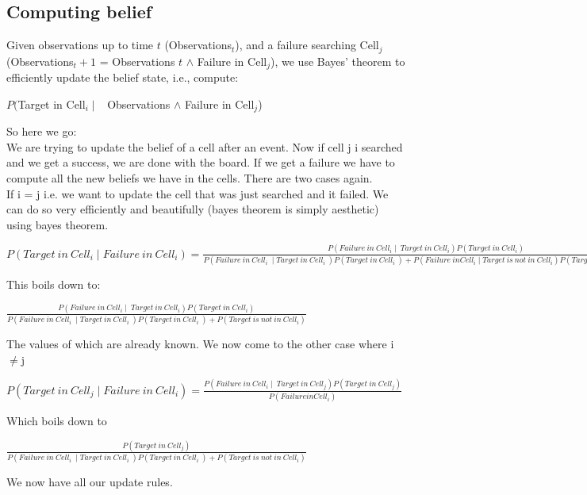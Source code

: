 \documentclass[12pt]{article} %
\begin{document}
\subsection{Computing belief} 
Given observations up to time $t$ (Observations$_t$), and a failure searching Cell$_j$ (Observations$_t+1$ = Observations $t$ $\wedge$ Failure in Cell$_j$), we use Bayes’ theorem to efficiently update the belief state, i.e., compute:
\begin{center}
  $P($Target in Cell$_i\mid$ \ Observations $\wedge$ Failure in Cell$_j$)
\end{center}
So here we go:\\
We are trying to update the belief of a cell after an event. Now if cell j i searched and we get a success, we are done with the board. If we get a failure we have to compute all the new beliefs we have in the cells. There are two cases again. \\
If i = j i.e. we want to update the cell that was just searched and it failed. We can do so very efficiently and beautifully (bayes theorem is simply aesthetic) using bayes theorem. 
\begin{center}
$P(Target\ in\  Cell_i\mid Failure\  in\  Cell_i) = \frac{P(Failure\ in\ Cell_i \mid\  Target\  in\  Cell_i)P(Target\  in\  Cell_i)}{P(Failure\  in\  Cell_i\  \mid Target\  in\  Cell_i\ )P(Target\  in\  Cell_i\ )+P(Failure\ in Cell_i \mid Target\  is\  not\  in\  Cell_i)P(Target\  is\  not\  in\  Cell_i)}$

\end{center}
This boils down to:\\
\begin{center}

$\frac{P(Failure\ in\ Cell_i \mid\  Target\  in\  Cell_i)P(Target\  in\  Cell_i)}{P(Failure\  in\  Cell_i\  \mid Target\  in\  Cell_i\ )P(Target\  in\  Cell_i\ )+P(Target\  is\  not\  in\  Cell_i)}$

\end{center}
The values of which are already known. We now come to the other case where i$\neq$j
\begin{center}
$P(Target\ in\  Cell_j\mid Failure\  in\  Cell_i) = \frac{P(Failure\ in\ Cell_i \mid\  Target\  in\  Cell_j)P(Target\  in\  Cell_j)}{P(Failure in Cell_i)}$
\end{center}
Which boils down to
\begin{center}
$\frac{P(Target\  in\  Cell_j)}{P(Failure\  in\  Cell_i\  \mid Target\  in\  Cell_i\ )P(Target\  in\  Cell_i\ )+P(Target\  is\  not\  in\  Cell_i)}$
\end{center}
We now have all our update rules. 
\end{document}
